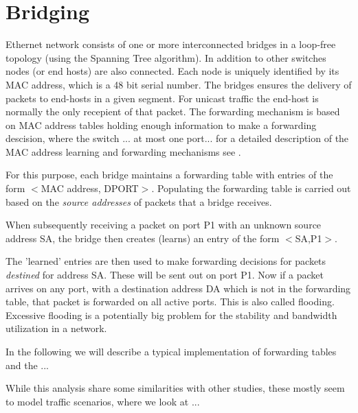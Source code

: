 \section{Bridging}
 Ethernet network consists of one or more interconnected bridges
in a loop-free topology (using the Spanning Tree algorithm). In 
addition to other switches nodes (or end hosts) are also connected.
Each node is uniquely identified by its MAC address, which is a 48 bit 
serial number. The bridges ensures the delivery of packets to end-hosts
in a given segment. For unicast traffic the end-host is normally the only recepient 
of that packet. The forwarding mechanism is based on MAC address
tables holding enough information to make a forwarding descision,
where the switch ... at most one port... \cite{IEEE802.1D} for a detailed description of the MAC address learning and 
forwarding mechanisms see \cite{Ray2007}.

For this purpose, each bridge maintains a forwarding table with entries
of the form $<$MAC address, DPORT$>$. 
Populating the forwarding table is carried out based on the
{\em source addresses} of packets that a bridge receives. 

When subsequently receiving a packet on port P1 with an unknown
source address SA, the bridge then creates (learns) an entry of the form
$<$SA,P1$>$.

The 'learned' entries are then used to make forwarding
decisions for packets {\em destined} for address SA. These
will be sent out on port P1. Now if a packet arrives on 
any port, with a destination address DA which is not in the 
forwarding table, that packet is forwarded on all active ports.
This is also called flooding. Excessive flooding is a potentially big 
problem for the stability and bandwidth utilization in a network.

In the following we will describe a typical implementation of 
forwarding tables and the ...

While this analysis share some similarities with other studies,
these mostly seem to model traffic scenarios, where we look
at ...

